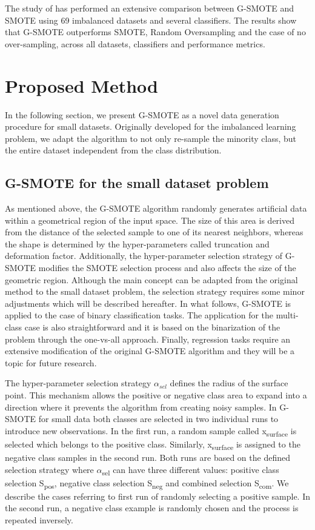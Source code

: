 \documentclass[parskip=full]{scrartcl}
\begin{document}
The study of \cite{Douzas.2019b} has performed an extensive comparison between G-SMOTE and 
SMOTE using 69 imbalanced datasets and several classifiers. The results show that G-SMOTE 
outperforms SMOTE, Random Oversampling and the case of no over-sampling, across all datasets, 
classifiers and performance metrics.

\section{Proposed Method}

In the following section, we present G-SMOTE as a novel data generation procedure for small datasets. 
Originally developed for the imbalanced learning problem, we adapt the algorithm to not only re-sample 
the minority class, but the entire dataset independent from the class distribution. 

\subsection{G-SMOTE for the small dataset problem}

As mentioned above, the G-SMOTE algorithm randomly generates artificial data within a geometrical 
region of the input space. The size of this area is derived from the distance of the selected sample to 
one of its nearest neighbors, whereas the shape is determined by the hyper-parameters called 
truncation and deformation factor. Additionally, the hyper-parameter selection strategy of G-SMOTE 
modifies the SMOTE selection process and also affects the size of the geometric region. Although the 
main concept can be adapted from the original method to the small dataset problem, the selection 
strategy requires some minor adjustments which will be described hereafter. In what follows, G-SMOTE 
is applied to the case of binary classification tasks. The application for the multi-class case is also 
straightforward and it is based on the binarization of the problem through the one-vs-all approach. 
Finally, regression tasks require an extensive modification of the original G-SMOTE algorithm and they 
will be a topic for future research.

The hyper-parameter selection strategy $\alpha_{sel}$ defines the radius of the surface 
point. This mechanism allows the positive or negative class area to expand into a direction where it 
prevents the algorithm from creating noisy samples. In G-SMOTE for small data both classes are 
selected in two individual runs to 
introduce new observations. In the first run, a random sample called x\textsubscript{surface} is selected 
which belongs to the positive class. Similarly, x\textsubscript{surface} is assigned to the negative class 
samples in the second run. Both runs are based on the defined selection strategy where 
$\alpha$\textsubscript{sel} can have three different values: positive class selection 
S\textsubscript{pos}, negative class selection S\textsubscript{neg} and combined selection 
S\textsubscript{com}. We describe the cases referring to first run of randomly selecting a positive 
sample. In the second run, a negative class example is randomly chosen and the process is repeated 
inversely. 
\end{document}

